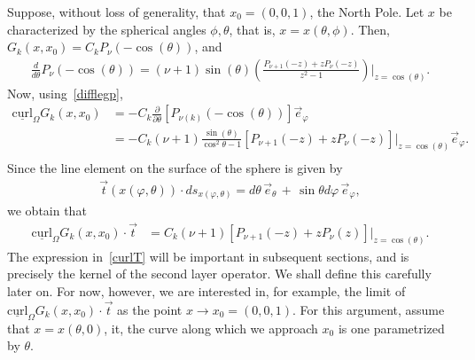 \documentclass[final]{siamltex}
\newcommand{\C}{C_k}
\begin{document}
Suppose, without loss of generality, that $x_0=(0,0,1)$, the North Pole.
Let $x$ be characterized by the spherical angles $\phi, \theta$, that
is, $x=x(\theta,\phi)$. Then, $G_k(x,x_0) = \C P_\nu(-\cos(\theta))$,
and
\begin{align}
  \label{difflegp} 
  \frac{d}{d\theta} P_\nu(-\cos(\theta)) =  
    (\nu+1)\sin(\theta) \left( \frac{ P_{\nu+1}(-z) +z
        P_{\nu}(-z)}{z^2-1} 
   \right)\vert_{z=\cos(\theta)}.
\end{align}
Now, using~\eqref{difflegp}, 
\begin{align*}
  \underline{\mbox{curl}}_{\Omega} G_k(x,x_0)&=-
  \C\frac{\partial}{\partial \theta} \left[P_{\nu(k)}(-\cos(\theta))
  \right] \vec{e}_\varphi \\
  &=-\C(\nu+1)\frac{\sin(\theta)}{\cos^2\theta -1} 
    \left[ P_{\nu+1}(-z) + 
   z 
    P_\nu(-z)\right]\vert_{z=\cos(\theta)} \vec{e}_\varphi. \\
\end{align*}
Since the line element on the surface of the sphere is given by
\begin{align*}
  \vec{t}(x(\varphi,\theta))\cdot ds_{x(\varphi,\theta)} = 
    d\theta\,\vec{e}_{\theta} \,+
    \, \sin\theta d\varphi \,\vec{e}_{\varphi}, 
\end{align*} we obtain that
\begin{align}
  \label{curlT}
  \underline{\mbox{curl}}_{\Omega} G_k(x,x_0)\cdot \vec{t} &= 
  \C (\nu+1)  \left[ P_{\nu+1}(-z) + 
  z P_\nu(z)\right]\vert_{z=\cos(\theta)}.
\end{align}
The expression in~\eqref{curlT} will be important in subsequent sections, and is precisely the kernel of the second layer operator. We shall define this carefully later on. For now, however, we are interested in, for example, the limit of $ \underline{\mbox{curl}}_{\Omega} G_k(x,x_0)\cdot \vec{t}$ as the point $x\rightarrow x_0=(0,0,1)$. For this argument, assume that $x=x(\theta,0)$, it, the curve along which we approach $x_0$ is one parametrized by $\theta$. 
\end{document}
